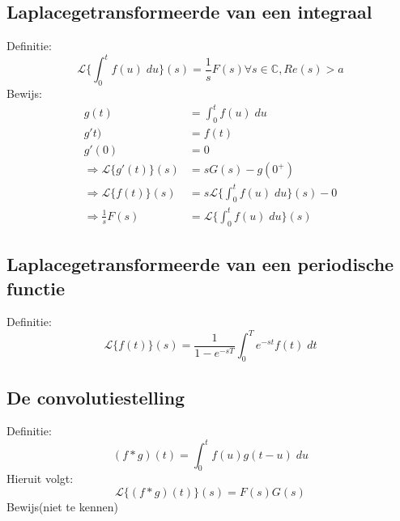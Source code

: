 \subsection{Laplacegetransformeerde van een integraal}
Definitie:
$$\mathcal{L}\bigg\{\int_0^tf(u)\;du\bigg\}(s) = \frac{1}{s}F(s) \forall s \in \mathbb{C}, Re(s) > a$$
Bewijs:
\begin{equation*}
 \begin{split}
  g(t) & = \int_{0}^{t}f(u)\;du \\
  g't) & = f(t) \\
  g'(0) & = 0 \\
  \Rightarrow \mathcal{L}\{g'(t)\}(s) & = sG(s) - g(0^+) \\
  \Rightarrow \mathcal{L}\{f(t)\}(s) & = s\mathcal{L}\bigg\{\int_0^tf(u)\;du\bigg\}(s) - 0 \\
  \Rightarrow \frac{1}{s}F(s) & = \mathcal{L}\bigg\{\int_0^tf(u)\;du\bigg\}(s)
 \end{split}
\end{equation*}
\subsection{Laplacegetransformeerde van een periodische functie}
Definitie:
$$\mathcal{L}\{f(t)\}(s) = \frac{1}{1 - e^{-sT}}\int_0^{T}e^{-st}f(t)\; dt$$
\subsection{De convolutiestelling}
Definitie:
$$(f * g)(t) = \int_0^t f(u)g(t - u)\;du$$
Hieruit volgt:
$$
\mathcal{L}\{(f * g)(t)\}(s) = F(s)G(s)$$
Bewijs(niet te kennen)

